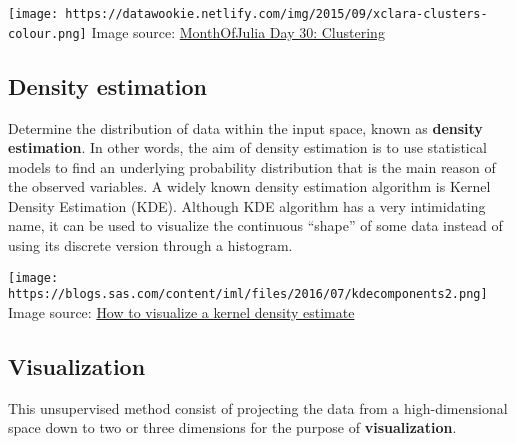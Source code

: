 \documentclass[]{book}
\begin{document}
\texttt{[image: https://datawookie.netlify.com/img/2015/09/xclara-clusters-colour.png]}
Image source:
\href{https://datawookie.netlify.com/blog/2015/10/monthofjulia-day-30-clustering/}{MonthOfJulia
Day 30: Clustering}

\subsection{Density estimation}\label{density-estimation}

Determine the distribution of data within the input space, known as
\textbf{density estimation}. In other words, the aim of density
estimation is to use statistical models to find an underlying
probability distribution that is the main reason of the observed
variables. A widely known density estimation algorithm is Kernel Density
Estimation (KDE). Although KDE algorithm has a very intimidating name,
it can be used to visualize the continuous ``shape'' of some data
instead of using its discrete version through a histogram.

\texttt{[image: https://blogs.sas.com/content/iml/files/2016/07/kdecomponents2.png]}
Image source:
\href{https://blogs.sas.com/content/iml/2016/07/27/visualize-kernel-density-estimate.html}{How
to visualize a kernel density estimate}

\subsection{Visualization}\label{visualization}

This unsupervised method consist of projecting the data from a
high-dimensional space down to two or three dimensions for the purpose
of \textbf{visualization}.


\end{document}
